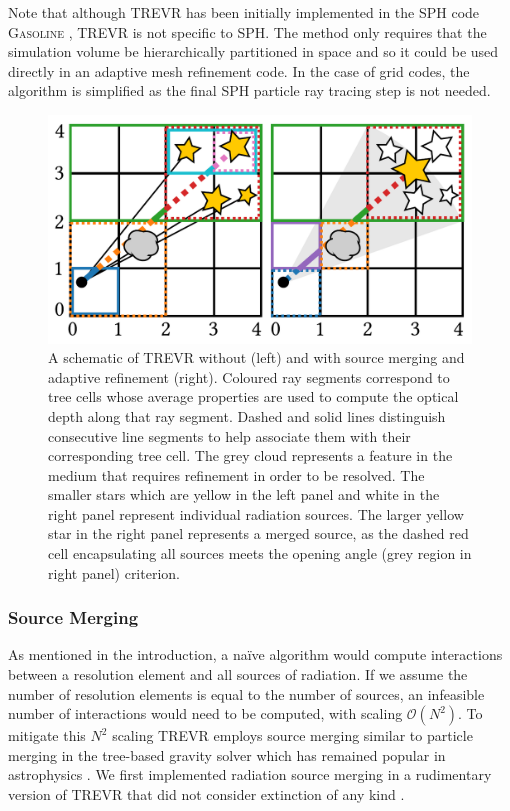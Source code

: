 \documentclass[fleq,usenatbib]{mnras}
\newcommand{\acro}{TREVR}
\newcommand{\bigO}[1]{\mathcal{O}\left(#1\right)}
\begin{document}
{Note that although \acro{} has been initially implemented in the SPH code 
\textsc{Gasoline} \citep{wadsleyEt17}, \acro{} is not specific to SPH. The 
method only requires that the simulation volume be hierarchically partitioned 
in space and so it could be used directly in an adaptive mesh refinement code. 
In the case of grid codes, the algorithm is simplified as the final SPH 
particle ray tracing step is not needed.
 
\begin{figure}
\includegraphics[width=1\linewidth]{Figures/algorithm.pdf}
\caption{A schematic of \acro{} without (left) and with source merging and 
adaptive refinement (right). Coloured ray segments correspond to tree cells 
whose average properties are used to compute the optical depth along that ray 
segment. Dashed and solid lines distinguish consecutive line segments to 
help associate them with their corresponding tree cell. The grey cloud 
represents a feature in the medium that requires refinement in order to be 
resolved. The smaller stars which are yellow in the left panel and white in 
the right panel represent individual radiation sources. The larger yellow star 
in the right panel represents a merged source, as the dashed red cell 
encapsulating all sources meets the opening angle (grey region in right panel) 
criterion.} 
\label{fig:algorithm}
\end{figure}

\subsubsection{Source Merging}
As mentioned in the introduction, a na\"ive algorithm would compute 
interactions between a resolution element and  all sources of radiation. If we 
assume the number of resolution elements is equal to the number of sources, 
an infeasible number of interactions would need to be computed, with scaling
$\bigO{N^2}$. To mitigate this $N^2$ scaling \acro{} employs source merging 
similar to particle merging in the \cite{barnesHut86} tree-based gravity 
solver which has remained popular in astrophysics 
\citep{benz88,vineSigurdsson98,springelEt01,wadsleyEt04,hubberEt11}. We first
implemented radiation source merging in a rudimentary version of \acro{} 
that did not consider extinction of any kind \citep{KannanEt14}.

}
\end{document}
